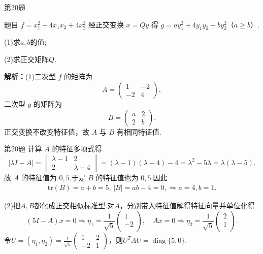 \documentclass[aspectratio=169]{beamer}
\begin{document}
\begin{frame}{第20题}
\begin{block}{题目}
$f=x_1^2-4x_1x_2+4x_2^2$ 经正交变换 $x=Qy$ 得 $g=ay_1^2+4y_1y_2+by_2^2$（$a\geqslant b$）.

(1)求$a,b$的值;

(2)求正交矩阵$Q$.
\end{block}
\textbf{解析：}(1)二次型 $f$ 的矩阵为
\[
A=\begin{pmatrix}1&-2\\-2&4\end{pmatrix},
\]
二次型 $g$ 的矩阵为
\[
B=\begin{pmatrix}a&2\\2&b\end{pmatrix}.
\]
正交变换不改变特征值，故 $A$ 与 $B$ 有相同特征值.
\end{frame}

\begin{frame}{第20题}
计算 $A$ 的特征多项式得
\[
|\lambda I-A|
=\begin{vmatrix}\lambda-1&2\\2&\lambda-4\end{vmatrix}
=(\lambda-1)(\lambda-4)-4
=\lambda^2-5\lambda
=\lambda(\lambda-5).
\]
故 $A$ 的特征值为 $0,5$.于是 $B$ 的特征值也为 $0,5$.因此
\begin{align*}
\text{tr}(B)=a+b=5,\,|B|=ab-4=0,\Longrightarrow a=4,b=1.
\end{align*}

(2)把$A,B$都化成正交相似标准型.对$A$，分别带入特征值解得特征向量并单位化得
\[
\left( 5I-A \right) x=0\Longrightarrow \eta _1=\frac{1}{\sqrt{5}}\left( \begin{array}{c}
1\\
-2\\
\end{array} \right) ,\quad Ax=0\Longrightarrow \eta _2=\frac{1}{\sqrt{5}}\left( \begin{array}{c}
2\\
1\\
\end{array} \right) .
\]
令$U=(\eta_1,\eta_2)=\frac1{\sqrt5}\begin{pmatrix}1&2\\-2&1\end{pmatrix}$，则$U^{T}AU=\operatorname{diag}\{5,0\}.$
\end{frame}
\end{document}
